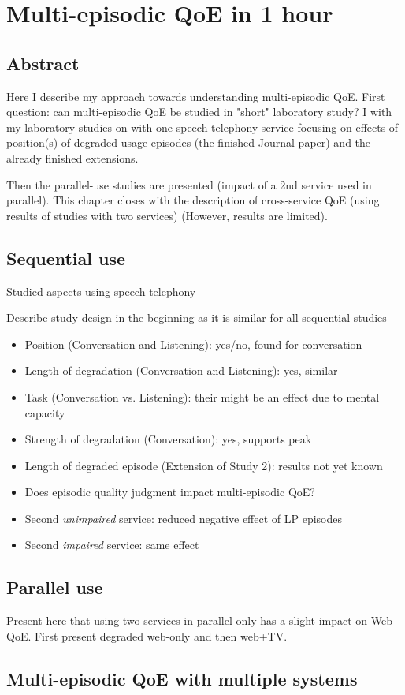 \chapter{Multi-episodic QoE in 1 hour}\label{chap:06}
\section*{Abstract}
Here I describe my approach towards understanding multi-episodic QoE.
First question: can multi-episodic QoE be studied in "short" laboratory study?
I with my laboratory studies on with one speech telephony service focusing on effects of position(s) of degraded usage episodes (the finished Journal paper) and the already finished extensions.

Then the parallel-use studies are presented (impact of a 2nd service used in parallel).
This chapter closes with the description of cross-service QoE (using results of studies with two services) (However, results are limited).

\section{Sequential use} %
Studied aspects using speech telephony

Describe study design in the beginning as it is similar for all sequential studies

\begin{itemize}
\item Position (Conversation and Listening): yes/no, found for conversation
\item Length of degradation (Conversation and Listening): yes, similar
\item Task (Conversation vs. Listening): their might be an effect due to mental capacity
\item Strength of degradation (Conversation): yes, supports peak
\item Length of degraded episode (Extension of Study 2): results not yet known %
\item Does episodic quality judgment impact multi-episodic QoE? %
\item Second \textit{unimpaired} service: reduced negative effect of LP episodes
\item Second \textit{impaired} service: same effect
\end{itemize}

\section{Parallel use}
Present here that using two services in parallel only has a slight impact on Web-QoE.
First present degraded web-only and then web+TV.

\section{Multi-episodic QoE with multiple systems} %